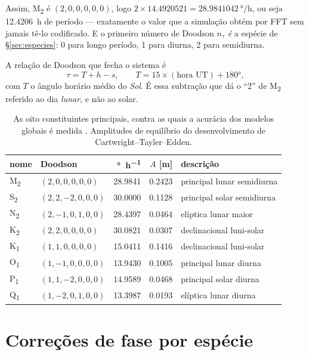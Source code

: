 \documentclass[11pt,a4paper,oneside]{report}
\theoremstyle{definition}
\theoremstyle{plain}
\theoremstyle{remark}
\begin{document}
Assim, M\textsubscript{2} é $(2,0,0,0,0,0)$, logo
$2\times\num{14.4920521}=\SI{28.9841042}{\degree\per\hour}$, ou seja
\SI{12.4206}{\hour} de período — exatamente o valor que a simulação obtém por
FFT sem jamais tê-lo codificado. E o primeiro número de Doodson $n_\tau$
\emph{é} a espécie de \S\ref{sec:especies}: 0 para longo período, 1 para
diurna, 2 para semidiurna.

A relação de Doodson que fecha o sistema é
\begin{equation}
\tau=T+h-s,\qquad T=15\times(\text{hora UT})+\ang{180},
\end{equation}
com $T$ o ângulo horário médio do \emph{Sol}. É essa subtração que dá o ``2''
de M\textsubscript{2} referido ao dia \emph{lunar}, e não ao solar.

\begin{table}[htbp]
\centering
\caption{As oito constituintes principais, contra as quais a acurácia dos
modelos globais é medida \cite{stammer2014}. Amplitudes de equilíbrio do
desenvolvimento de Cartwright--Tayler--Edden.}
\label{tab:constituintes}
\begin{tabular}{@{}llrrl@{}}
\toprule
nome & Doodson & \si{\degree\per\hour} & $A$ [m] & descrição \\
\midrule
M\textsubscript{2} & $(2,0,0,0,0,0)$ & \num{28.9841} & \num{0.2423} & principal lunar semidiurna \\
S\textsubscript{2} & $(2,2,-2,0,0,0)$ & \num{30.0000} & \num{0.1128} & principal solar semidiurna \\
N\textsubscript{2} & $(2,-1,0,1,0,0)$ & \num{28.4397} & \num{0.0464} & elíptica lunar maior \\
K\textsubscript{2} & $(2,2,0,0,0,0)$ & \num{30.0821} & \num{0.0307} & declinacional luni-solar \\
K\textsubscript{1} & $(1,1,0,0,0,0)$ & \num{15.0411} & \num{0.1416} & declinacional luni-solar \\
O\textsubscript{1} & $(1,-1,0,0,0,0)$ & \num{13.9430} & \num{0.1005} & principal lunar diurna \\
P\textsubscript{1} & $(1,1,-2,0,0,0)$ & \num{14.9589} & \num{0.0468} & principal solar diurna \\
Q\textsubscript{1} & $(1,-2,0,1,0,0)$ & \num{13.3987} & \num{0.0193} & elíptica lunar diurna \\
\bottomrule
\end{tabular}
\end{table}

\section{Correções de fase por espécie}
\label{sec:correcaofase}
\end{document}
